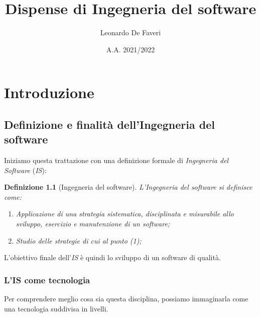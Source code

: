 \documentclass[12pt, a4paper]{report}
\title{Dispense di Ingegneria del software}
\author{Leonardo De Faveri}
\date{A.A. 2021/2022}
\theoremstyle{def}
\newtheorem{definition}{Definizione}
\theoremstyle{definition}
\begin{document}
\maketitle
\tableofcontents

\chapter{Introduzione}
\section{Definizione e finalità dell'Ingegneria del software}
Iniziamo questa trattazione con una definizione formale di \emph{Ingegneria del
Software} (\emph{IS}):
\begin{definition}[Ingegneria del software]
    L'Ingegneria del software si definisce come:
    \begin{enumerate}
        \item Applicazione di una strategia sistematica, disciplinata e
        misurabile allo sviluppo, esercizio e manutenzione di un software;
        \item Studio delle strategie di cui al punto (1);
    \end{enumerate}
\end{definition}\noindent
L'obiettivo finale dell'\emph{IS} è quindi lo sviluppo di un software di qualità.

\subsection{L'IS come tecnologia}
Per comprendere meglio cosa sia questa disciplina, possiamo immaginarla come una
tecnologia suddivisa in livelli.
\end{document}
